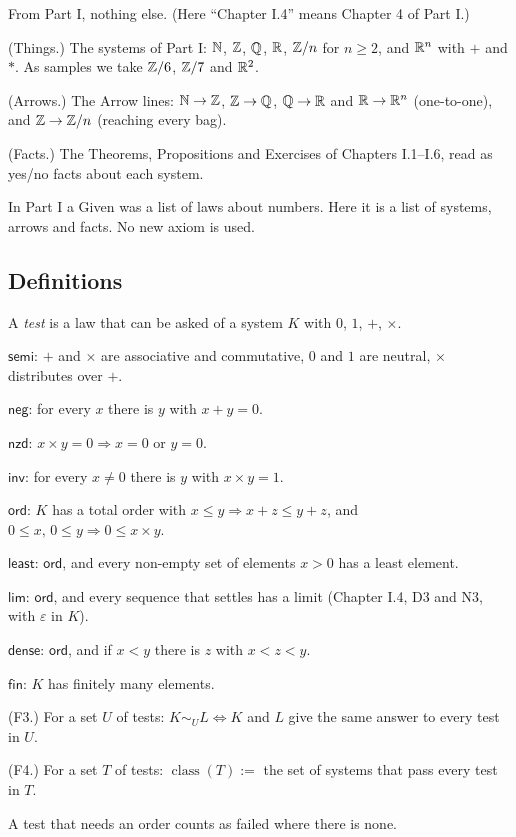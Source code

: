 From Part I, nothing else. (Here ``Chapter I.4'' means Chapter 4 of Part I.)
\begin{lines}
\item[\lab{G1}] (Things.) The systems of Part I: $\mathbb{N}$, $\mathbb{Z}$, $\mathbb{Q}$, $\mathbb{R}$, $\mathbb{Z}/n$ for $n \ge 2$, and $\mathbb{R}^n$ with $+$ and $\ast$. As samples we take $\mathbb{Z}/6$, $\mathbb{Z}/7$ and $\mathbb{R}^2$.
\item[\lab{G2}] (Arrows.) The Arrow lines: $\mathbb{N} \to \mathbb{Z}$, $\mathbb{Z} \to \mathbb{Q}$, $\mathbb{Q} \to \mathbb{R}$ and $\mathbb{R} \to \mathbb{R}^n$ (one-to-one), and $\mathbb{Z} \to \mathbb{Z}/n$ (reaching every bag).
\item[\lab{G3}] (Facts.) The Theorems, Propositions and Exercises of Chapters I.1--I.6, read as yes/no facts about each system.
\end{lines}
In Part I a Given was a list of laws about numbers. Here it is a list of systems, arrows and facts. No new axiom is used.

\subsection*{Definitions}

A \emph{test} is a law that can be asked of a system $K$ with $0$, $1$, $+$, $\times$.
\begin{lines}
\item[\lab{D1}] $\mathsf{semi}$: $+$ and $\times$ are associative and commutative, $0$ and $1$ are neutral, $\times$ distributes over $+$.
\item[\lab{D2}] $\mathsf{neg}$: for every $x$ there is $y$ with $x + y = 0$.
\item[\lab{D3}] $\mathsf{nzd}$: $x \times y = 0 \Rightarrow x = 0$ or $y = 0$.
\item[\lab{D4}] $\mathsf{inv}$: for every $x \neq 0$ there is $y$ with $x \times y = 1$.
\item[\lab{D5}] $\mathsf{ord}$: $K$ has a total order with $x \le y \Rightarrow x + z \le y + z$, and $0 \le x,\, 0 \le y \Rightarrow 0 \le x \times y$.
\item[\lab{D6}] $\mathsf{least}$: $\mathsf{ord}$, and every non-empty set of elements $x > 0$ has a least element.
\item[\lab{D7}] $\mathsf{lim}$: $\mathsf{ord}$, and every sequence that settles has a limit (Chapter I.4, D3 and N3, with $\varepsilon$ in $K$).
\item[\lab{D8}] $\mathsf{dense}$: $\mathsf{ord}$, and if $x < y$ there is $z$ with $x < z < y$.
\item[\lab{D9}] $\mathsf{fin}$: $K$ has finitely many elements.
\item[\lab{D10}] (F3.) For a set $U$ of tests: $K \sim_U L \iff K$ and $L$ give the same answer to every test in $U$.
\item[\lab{D11}] (F4.) For a set $T$ of tests: $\operatorname{class}(T) :=$ the set of systems that pass every test in $T$.
\end{lines}
A test that needs an order counts as failed where there is none.

